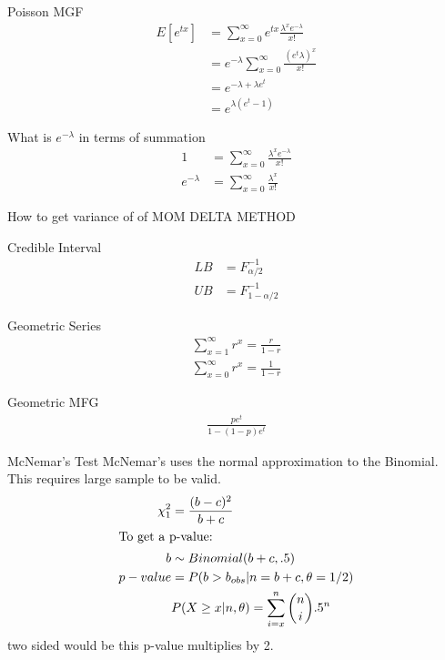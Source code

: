 \documentclass[avery5388,grid,frame]{flashcards}
\begin{document}
\begin{flashcard}[Proof]{Poisson MGF}
\bigskip\bigskip
{\begin{align*}
E[e^{tx}]&=\sum_{x=0}^\infty e^{tx}\frac{\lambda^xe^{-\lambda}}{x!}\\
&=e^{-\lambda}\sum_{x=0}^\infty\frac{(e^t\lambda)^x}{x!}\\
&=e^{-\lambda+\lambda e^t}\\
&=e^{\lambda(e^t-1)}
\end{align*}}
\end{flashcard}
\begin{flashcard}{What is $e^{-\lambda}$ in terms of summation}
\bigskip\bigskip
{\begin{align*}
1&=\sum_{x=0}^\infty\frac{\lambda^xe^{-\lambda}}{x!}\\
e^{-\lambda}&=\sum_{x=0}^\infty\frac{\lambda^x}{x!}
\end{align*}}
\end{flashcard}
\begin{flashcard}{How to get variance of of MOM}
\bigskip
\Huge{
DELTA METHOD}
\end{flashcard}
\begin{flashcard}{Credible Interval}
\bigskip\bigskip\bigskip
{\begin{align*}
LB&=F^{-1}_{\alpha/2}\\
UB&=F^{-1}_{1-\alpha/2}
\end{align*}}
\end{flashcard}
\begin{flashcard}{Geometric Series}
\bigskip\bigskip\bigskip
{\begin{align*}
\sum_{x=1}^\infty r^x=\frac{r}{1-r}\\
\sum_{x=0}^\infty r^x=\frac{1}{1-r}
\end{align*}}
\end{flashcard}
\begin{flashcard}{Geometric MFG}
\bigskip\bigskip\bigskip
{\begin{align*}
\frac{pe^t}{1-(1-p)e^t}
\end{align*}}
\end{flashcard}
 \begin{flashcard}[Test]{McNemar's Test}
 McNemar's uses the normal approximation to the Binomial. This requires large sample to be valid.
 {\begin{align*}
 \chi^2_1&=\frac{(b-c)^2}{b+c}\\
 \intertext{To get a p-value:}
 b&\sim Binomial(b+c,.5)\\
 p-value&=P(b>b_{obs}|n=b+c, \theta=1/2)\\
 &P(X\geq x|n,\theta)=\sum_{i=x}^n{n\choose i}.5^n\\
 \end{align*}}
 two sided would be this p-value multiplies by 2.
 \end{flashcard}
\end{document}
